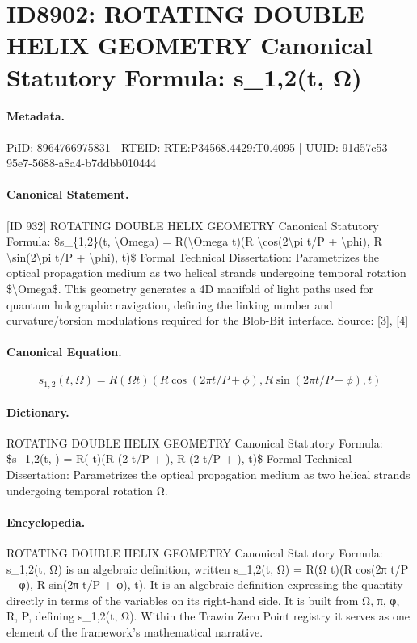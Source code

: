 \section*{ID8902: ROTATING DOUBLE HELIX GEOMETRY Canonical Statutory Formula: s\_1,2(t, Ω)}
\paragraph{Metadata.}
PiID: 8964766975831 | RTEID: RTE:P34568.4429:T0.4095 | UUID: 91d57c53-95e7-5688-a8a4-b7ddbb010444

\paragraph{Canonical Statement.}
[ID 932] ROTATING DOUBLE HELIX GEOMETRY Canonical Statutory Formula: \$s\_\{1,2\}(t, \textbackslash{}Omega) = R(\textbackslash{}Omega t)(R \textbackslash{}cos(2\textbackslash{}pi t/P + \textbackslash{}phi), R \textbackslash{}sin(2\textbackslash{}pi t/P + \textbackslash{}phi), t)\$ Formal Technical Dissertation: Parametrizes the optical propagation medium as two helical strands undergoing temporal rotation \$\textbackslash{}Omega\$. This geometry generates a 4D manifold of light paths used for quantum holographic navigation, defining the linking number and curvature/torsion modulations required for the Blob-Bit interface. Source: [3], [4]

\paragraph{Canonical Equation.}
\[
s_{1,2}(t, \Omega) = R(\Omega t)(R \cos(2\pi t/P + \phi), R \sin(2\pi t/P + \phi), t)
\]

\paragraph{Dictionary.}
ROTATING DOUBLE HELIX GEOMETRY Canonical Statutory Formula: \$s\_1,2(t, ) = R( t)(R (2 t/P + ), R (2 t/P + ), t)\$ Formal Technical Dissertation: Parametrizes the optical propagation medium as two helical strands undergoing temporal rotation Ω.

\paragraph{Encyclopedia.}
ROTATING DOUBLE HELIX GEOMETRY Canonical Statutory Formula: s\_1,2(t, Ω) is an algebraic definition, written s\_1,2(t, Ω) = R(Ω t)(R cos(2π t/P + φ), R sin(2π t/P + φ), t). It is an algebraic definition expressing the quantity directly in terms of the variables on its right-hand side. It is built from Ω, π, φ, R, P, defining s\_1,2(t, Ω). Within the Trawin Zero Point registry it serves as one element of the framework's mathematical narrative.
